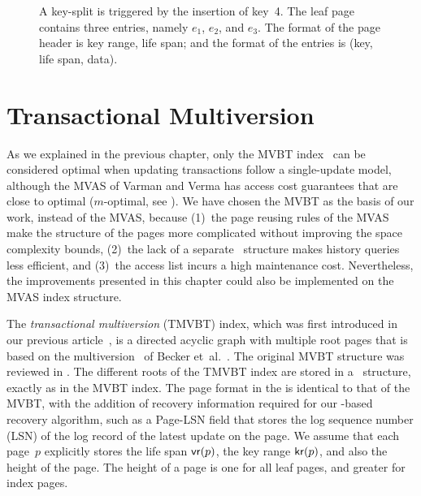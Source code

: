 \begin{figure}[htb]
\begin{center}
  
  {A key-split is triggered by the insertion of key~\num{4}.
  The leaf page contains three entries, namely $e_1$, $e_2$, and $e_3$.
  The format of the page header is key range, life span; 
  and the format of the entries is (key, life span, data).}
  \label{fig:mvbt-invalid-split-solved}
\end{center}
\end{figure}


\section{Transactional Multiversion \Btree}
\label{sec:tmvbt:structure}

As we explained in the previous chapter, only the MVBT
index~\cite{becker:1993:optimal,becker:1996:mvbt} can be
considered optimal when updating transactions follow a single-update model,
although the MVAS of Varman and Verma has access cost guarantees that are close
to optimal ($m$-optimal, see ).
We have chosen the MVBT as the basis of our work, instead of the MVAS,
because
(1)~the page reusing rules of the MVAS make the structure of the pages more
complicated without improving the space complexity bounds, 
(2)~the lack of a separate \rootstar\ structure makes history queries less
efficient, and
(3)~the access list incurs a high maintenance cost.
Nevertheless, the improvements presented in this chapter could also be
implemented on the MVAS index structure.

The \emph{transactional multiversion \Btree} (TMVBT) index, which was first
introduced in our previous article~\cite{haapasalo:2009:tmvbt}, is a directed
acyclic graph with multiple root pages that is based on the multiversion
\Btree\ of Becker et~al.~\cite{becker:1993:optimal,becker:1996:mvbt}.
The original MVBT structure was reviewed in .
The different roots of the TMVBT index are stored in a \rootstar\ structure,
exactly as in the MVBT index.
The page format in the  is identical to that of the MVBT, with
the addition of recovery information required for our -based
recovery algorithm, such as a Page-LSN field that stores the log
sequence number (LSN) of the log record
of the latest update on the page. 
We assume that each page~$p$ explicitly stores the life span $\text{\textsf{vr}}(p)$,
the key range $\text{\textsf{kr}}(p)$, and also the height of the page.
The height of a page is one for all leaf pages, and greater 
for index pages.

